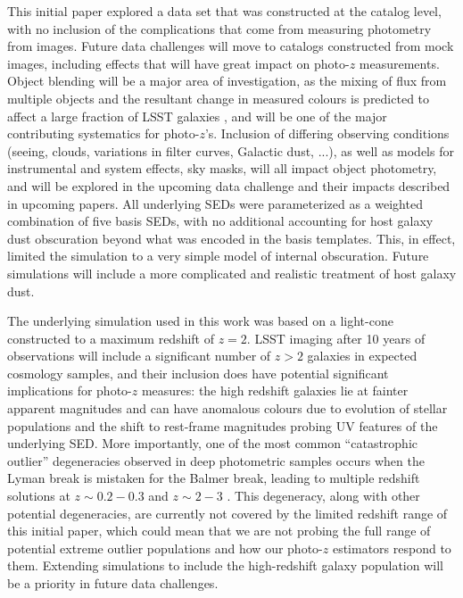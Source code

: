 \documentclass[usenatbib]{mn2e}
\begin{document}
This initial paper explored a data set that was constructed at the catalog level, with no inclusion of the complications that come from measuring photometry from images.  Future data challenges will move to catalogs constructed from mock images, including effects that will have great impact on photo-$z$ measurements.  Object blending will be a major area of investigation, as the mixing of flux from multiple objects and the resultant change in measured colours is predicted to affect a large fraction of LSST galaxies \citep{Dawson:2016}, and will be one of the major contributing systematics for photo-$z$'s.  Inclusion of differing observing conditions (seeing, clouds, variations in filter curves, Galactic dust, ...), as well as models for instrumental and system effects, sky masks, will all impact object photometry, and will be explored in the upcoming data challenge and their impacts described in upcoming papers.
All underlying SEDs were parameterized as a weighted combination of five basis SEDs, with no additional accounting for host galaxy dust obscuration beyond what was encoded in the basis templates.  This, in effect, limited the simulation to a very simple model of internal obscuration.  Future simulations will include a more complicated and realistic treatment of host galaxy dust.

The underlying simulation used in this work was based on a light-cone constructed to a maximum redshift of $z=2$.  LSST imaging after 10 years of observations will include a significant number of $z>2$ galaxies in expected cosmology samples, and their inclusion does have potential significant implications for photo-$z$ measures: the high redshift galaxies lie at fainter apparent magnitudes and can have anomalous colours due to evolution of stellar populations and the shift to rest-frame magnitudes probing UV features of the underlying SED.  More importantly, one of the most common ``catastrophic outlier'' degeneracies observed in deep photometric samples occurs when the Lyman break is mistaken for the Balmer break, leading to multiple redshift solutions at $z\sim0.2-0.3$ and $z\sim2-3$ \citep{Massarotti:2001}.  This degeneracy, along with other potential degeneracies, are currently not covered by the limited redshift range of this initial paper, which could mean that we are not probing the full range of potential extreme outlier populations and how our photo-$z$ estimators respond to them. Extending simulations to include the high-redshift galaxy population will be a priority in future data challenges.
\end{document}
